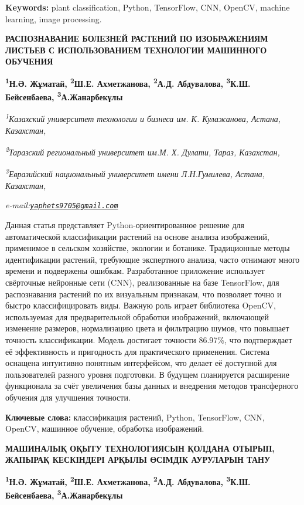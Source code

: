 {{{\bfseries Keywords:} plant classification, Python, TensorFlow, CNN,
OpenCV, machine learning, image processing.

{\bfseries РАСПОЗНАВАНИЕ БОЛЕЗНЕЙ РАСТЕНИЙ ПО ИЗОБРАЖЕНИЯМ ЛИСТЬЕВ С
ИСПОЛЬЗОВАНИЕМ ТЕХНОЛОГИИ МАШИННОГО ОБУЧЕНИЯ}

{\bfseries \textsuperscript{1}Н.Ә. Жұматай, \textsuperscript{2}Ш.Е.
Ахметжанова, \textsuperscript{2}А.Д. Абдувалова, \textsuperscript{3}К.Ш.
Бейсенбаева, \textsuperscript{3}А.Жанарбекұлы\textsuperscript{\envelope }}

\emph{\textsuperscript{1}Казахский университет технологии и бизнеса им.
К. Кулажанова, Астана, Казахстан,}

\emph{\textsuperscript{2}Таразский региональный университет им.М. Х.
Дулати, Тараз, Казахстан,}

\emph{\textsuperscript{3}Евразийский национальный университет имени
Л.Н.Гумилева, Астана, Казахстан,}

\emph{e-mail:\href{mailto:yaphets9705@gmail.com}{\nolinkurl{yaphets9705@gmail.com}}}

Данная статья представляет Python-ориентированное решение для
автоматической классификации растений на основе анализа изображений,
применимое в сельском хозяйстве, экологии и ботанике. Традиционные
методы идентификации растений, требующие экспертного анализа, часто
отнимают много времени и подвержены ошибкам. Разработанное приложение
использует свёрточные нейронные сети (CNN), реализованные на базе
TensorFlow, для распознавания растений по их визуальным признакам, что
позволяет точно и быстро классифицировать виды. Важную роль играет
библиотека OpenCV, используемая для предварительной обработки
изображений, включающей изменение размеров, нормализацию цвета и
фильтрацию шумов, что повышает точность классификации. Модель достигает
точности 86.97\%, что подтверждает её эффективность и пригодность для
практического применения. Система оснащена интуитивно понятным
интерфейсом, что делает её доступной для пользователей разного уровня
подготовки. В будущем планируется расширение функционала за счёт
увеличения базы данных и внедрения методов трансферного обучения для
улучшения точности.

{\bfseries Ключевые слова:} классификация растений, Python, TensorFlow,
CNN, OpenCV, машинное обучение, обработка изображений.

{\bfseries МАШИНАЛЫҚ ОҚЫТУ ТЕХНОЛОГИЯСЫН ҚОЛДАНА ОТЫРЫП, ЖАПЫРАҚ КЕСКІНДЕРІ
АРҚЫЛЫ ӨСІМДІК АУРУЛАРЫН ТАНУ}

{\bfseries \textsuperscript{1}Н.Ә. Жұматай, \textsuperscript{2}Ш.Е.
Ахметжанова, \textsuperscript{2}А.Д. Абдувалова, \textsuperscript{3}К.Ш.
Бейсенбаева, \textsuperscript{3}А.Жанарбекұлы\textsuperscript{\envelope }}

}}
